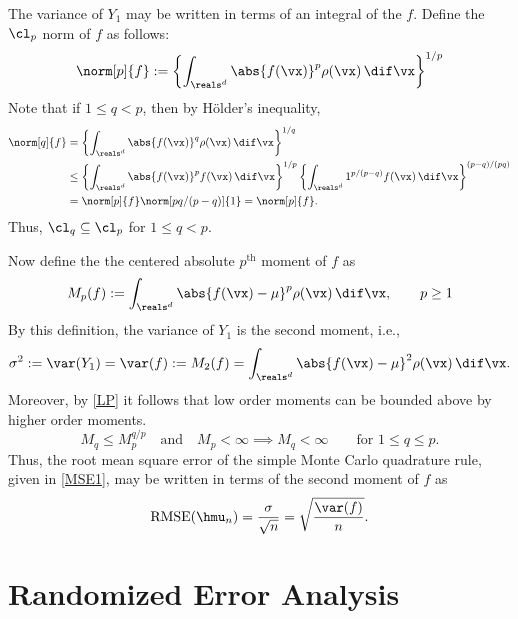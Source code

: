 \documentclass[12pt]{amsart}
\DeclareMathOperator{\RMSE}{RMSE}
\begin{document}
The variance of $Y_1$ may be written in terms of an integral of the $f$.  Define the $\cl_{p}$ norm of $f$ as follows:
\[
\norm[p]{f} :=\left\{\int_{\reals^d} \abs{f(\vx)}^p \rho(\vx) \, \dif \vx\right\}^{1/p}
\]
Note that if $1 \le q<p$, then by H\"older's inequality,
\begin{align}\label{LP}
\norm[q]{f} &=\left\{\int_{\reals^d} \abs{f(\vx)}^q \rho(\vx) \, \dif \vx\right\}^{1/q}\\
\nonumber & \le \left\{\int_{\reals^d} \abs{f(\vx)}^p f(\vx) \, \dif \vx \right\}^{1/p} \left\{\int_{\reals^d} 1^{p/(p-q)} f(\vx) \, \dif \vx\right\}^{(p-q)/(pq)} \\
\nonumber & = \norm[p]{f} \norm[pq/(p-q)]{1} = \norm[p]{f}.
\end{align}
Thus, $\cl_q \subseteq \cl_p$ for $1 \le q<p$.  

Now define the the centered absolute $p^{\text{th}}$ moment of $f$ as
\begin{equation} \label{momentdef}
M_p(f) := \int_{\reals^d} \abs{f(\vx)-\mu}^p \rho(\vx) \, \dif \vx, \qquad p \ge 1
\end{equation}
By this definition, the variance of $Y_1$ is the second moment, i.e., 
\begin{equation} \label{sigmadef}
\sigma^2 := \var(Y_1) = \var(f) := M_2(f) = \int_{\reals^d} \abs{f(\vx)-\mu}^2 \rho(\vx) \, \dif \vx.
\end{equation}
Moreover, by \eqref{LP} it follows that low order moments can be bounded above by higher order moments.
\begin{equation}\label{Mineq}
M_q \le M_p^{q/p} \quad \text{and} \quad M_p < \infty \implies M_q <\infty \qquad \text{for }1 \le q \le p.
\end{equation}
Thus, the root mean square error of the simple Monte Carlo quadrature rule, given in \eqref{MSE1}, may be written in terms of the second moment of $f$ as
\begin{equation}\label{MSE2}
\RMSE(\hmu_n) = \frac{\sigma}{\sqrt{n}} = \sqrt{\frac{\var(f)}{n}}.
\end{equation}

\section{Randomized Error Analysis}
\end{document}
